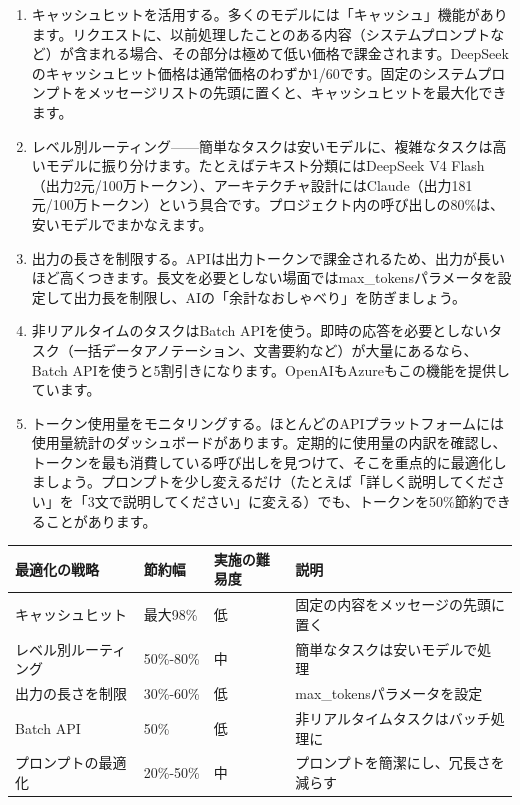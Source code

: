 \begin{enumerate}
  \item キャッシュヒットを活用する。多くのモデルには「キャッシュ」機能があります。リクエストに、以前処理したことのある内容（システムプロンプトなど）が含まれる場合、その部分は極めて低い価格で課金されます。DeepSeekのキャッシュヒット価格は通常価格のわずか1/60です。固定のシステムプロンプトをメッセージリストの先頭に置くと、キャッシュヒットを最大化できます。
  \item レベル別ルーティング——簡単なタスクは安いモデルに、複雑なタスクは高いモデルに振り分けます。たとえばテキスト分類にはDeepSeek V4 Flash（出力2元/100万トークン）、アーキテクチャ設計にはClaude（出力181元/100万トークン）という具合です。プロジェクト内の呼び出しの80\%は、安いモデルでまかなえます。
  \item 出力の長さを制限する。APIは出力トークンで課金されるため、出力が長いほど高くつきます。長文を必要としない場面ではmax\_tokensパラメータを設定して出力長を制限し、AIの「余計なおしゃべり」を防ぎましょう。
  \item 非リアルタイムのタスクはBatch APIを使う。即時の応答を必要としないタスク（一括データアノテーション、文書要約など）が大量にあるなら、Batch APIを使うと5割引きになります。OpenAIもAzureもこの機能を提供しています。
  \item トークン使用量をモニタリングする。ほとんどのAPIプラットフォームには使用量統計のダッシュボードがあります。定期的に使用量の内訳を確認し、トークンを最も消費している呼び出しを見つけて、そこを重点的に最適化しましょう。プロンプトを少し変えるだけ（たとえば「詳しく説明してください」を「3文で説明してください」に変える）でも、トークンを50\%節約できることがあります。
\end{enumerate}

\begin{center}
\begin{tabularx}{\linewidth}{|X|X|X|X|}
\hline
\textbf{最適化の戦略} & \textbf{節約幅} & \textbf{実施の難易度} & \textbf{説明} \tabularnewline
\hline
キャッシュヒット & 最大98\% & 低 & 固定の内容をメッセージの先頭に置く \tabularnewline
レベル別ルーティング & 50\%-80\% & 中 & 簡単なタスクは安いモデルで処理 \tabularnewline
出力の長さを制限 & 30\%-60\% & 低 & max\_tokensパラメータを設定 \tabularnewline
Batch API & 50\% & 低 & 非リアルタイムタスクはバッチ処理に \tabularnewline
プロンプトの最適化 & 20\%-50\% & 中 & プロンプトを簡潔にし、冗長さを減らす \tabularnewline
\hline
\end{tabularx}
\end{center}

